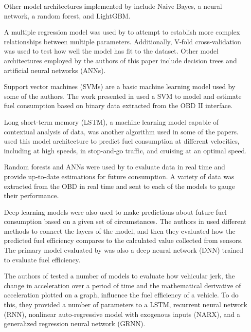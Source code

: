 \documentclass[letterpaper]{article}
\begin{document}
Other model architectures implemented by \cite{yang2022predicting} include Naive Bayes, 
a neural network, a random forest, and LightGBM. 

A multiple regression model was used by \cite{rykala2023modeling} to attempt to establish 
more complex relationships between multiple parameters. Additionally, V-fold cross-validation 
was used to test how well the model has fit to the dataset. Other model architectures
employed by the authors of this paper include decision trees and artificial
neural networks (ANNs). 

Support vector machines (SVMs) are a basic machine learning model used by some of the authors. 
The work presented in \cite{abukhalil2020fuel} used a SVM to model and estimate fuel 
consumption based on binary data extracted from the OBD II interface. 

Long short-term memory (LSTM), a machine learning model capable of contextual analysis of data, 
was another algorithm used in some of the papers. \cite{wang2020fuelnet} used this
model architecture to predict fuel consumption at different velocities,
including at high speeds, in stop-and-go traffic, and cruising at an optimal
speed. 

Random forests and ANNs were used by \cite{abediasl2024real} to
evaluate data in real time and provide up-to-date estimations for future
consumption. A variety of data was extracted from the OBD in real time and sent
to each of the models to gauge their performance. 

Deep learning models were also used to make predictions about future fuel consumption 
based on a given set of circumstances. The authors in \cite{yen_combining_2021} used 
different methods to connect the layers of the model, and then they evaluated how the 
predicted fuel efficiency compares to the calculated value collected from sensors. The
primary model evaluated by \cite{topic2022neural} was also a deep neural
network (DNN) trained to evaluate fuel efficiency. 

The authors of \cite{zhang2023novel} tested a number of models to evaluate how vehicular 
jerk, the change in acceleration over a period of time and the mathematical derivative of 
acceleration plotted on a graph, influence the fuel efficiency of a vehicle. To do this, 
they provided a number of parameters to a LSTM, recurrent neural network (RNN), nonlinear 
auto-regressive model with exogenous inputs (NARX), and a generalized regression neural 
network (GRNN).

\end{document}
